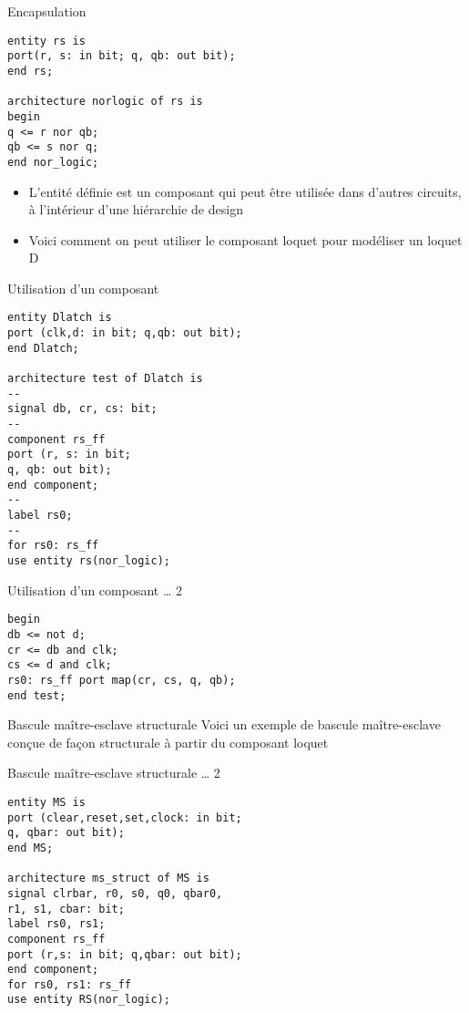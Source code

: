 \documentclass[presentation]{beamer}
\begin{document}
\begin{frame}[label={sec:orgfe7410a},fragile]{Encapsulation}
 \begin{verbatim}
entity rs is
port(r, s: in bit; q, qb: out bit);
end rs;

architecture norlogic of rs is
begin
q <= r nor qb;
qb <= s nor q;
end nor_logic;
\end{verbatim}

\begin{itemize}
\item L'entité définie est un composant qui peut être utilisée dans d'autres circuits, à l'intérieur d'une hiérarchie de design
\item Voici comment on peut utiliser le composant loquet pour modéliser un loquet D
\end{itemize}
\end{frame}

\begin{frame}[label={sec:org34b717d},fragile]{Utilisation d'un composant}
 \begin{verbatim}
entity Dlatch is
port (clk,d: in bit; q,qb: out bit);
end Dlatch;

architecture test of Dlatch is
--
signal db, cr, cs: bit;
--
component rs_ff
port (r, s: in bit;
q, qb: out bit);
end component;
--
label rs0;
--
for rs0: rs_ff
use entity rs(nor_logic);
\end{verbatim}
\end{frame}

\begin{frame}[label={sec:org74e9bf8},fragile]{Utilisation d'un composant \ldots{} 2}
 \begin{verbatim}
begin
db <= not d;
cr <= db and clk;
cs <= d and clk;
rs0: rs_ff port map(cr, cs, q, qb);
end test;
\end{verbatim}
\end{frame}


\begin{frame}[label={sec:org4d72951}]{Bascule maître-esclave structurale}
Voici un exemple de bascule maître-esclave conçue de façon structurale à partir du composant loquet
\end{frame}

\begin{frame}[label={sec:org3a2b1f4},fragile]{Bascule maître-esclave structurale \ldots{} 2}
 \begin{verbatim}
entity MS is
port (clear,reset,set,clock: in bit;
q, qbar: out bit);
end MS;

architecture ms_struct of MS is
signal clrbar, r0, s0, q0, qbar0,
r1, s1, cbar: bit;
label rs0, rs1;
component rs_ff
port (r,s: in bit; q,qbar: out bit);
end component;
for rs0, rs1: rs_ff
use entity RS(nor_logic);
\end{verbatim}
\end{frame}
\end{document}
